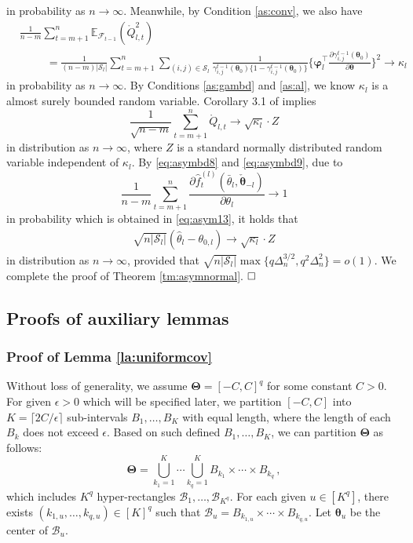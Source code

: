 \documentclass[12pt]{article}
\newcommand{\bTheta}{\boldsymbol \Theta}
\newcommand{\btheta}{\boldsymbol \theta}
\newcommand{\bvarphi}{\boldsymbol \varphi}
\def\T{{\scriptscriptstyle \top} }
\newcommand{\0}{{\bf 0}}
\begin{document}
in probability as $n\rightarrow\infty$. Meanwhile, by Condition \ref{as:conv}, we also have
\begin{align*}
&\frac{1}{n-m}\sum_{t=m+1}^n\mathbb{E}_{\mathcal{F}_{t-1}}(\mathring{Q}_{l,t}^2)\\
&~~~~~~~~~~~=\frac{1}{(n-m)|\mathcal{S}_l|}\sum_{t=m+1}^n\sum_{(i,j)\in\mathcal{S}_l}\frac{1}{\gamma_{i,j}^{t-1}(\btheta_0)\{1-\gamma_{i,j}^{t-1}(\btheta_0)\}}\bigg\{\bvarphi_l^{\T}\frac{\partial\gamma_{i,j}^{t-1}(\btheta_0)}{\partial\btheta}\bigg\}^2\rightarrow\kappa_l
\end{align*}
in probability as $n\rightarrow\infty$. By Conditions \ref{as:gambd} and \ref{as:al}, we know $\kappa_l$ is a almost surely bounded random variable. Corollary 3.1 of \cite{Hall1980_supp} 
implies
\[
\frac{1}{\sqrt{n-m}}\sum_{t=m+1}^n\mathring{Q}_{l,t}\rightarrow\sqrt{\kappa_l}\cdot Z
\]
in distribution as $n\rightarrow\infty$, where $Z$ is a standard normally distributed random variable independent of $\kappa_l$. By \eqref{eq:asymbd8} and \eqref{eq:asymbd9}, due to  
\[
\frac{1}{n-m}\sum_{t=m+1}^n\frac{\partial\hat{f}_t^{(l)}(\bar{\theta}_l,\check{\btheta}_{-l})}{\partial\theta_l}\rightarrow1
\]
in probability which is obtained in \eqref{eq:asym13}, it holds that
 \begin{align*}
\sqrt{n|\mathcal{S}_l|}(\hat{\theta}_l-\theta_{0,l})\rightarrow \sqrt{\kappa_l}\cdot Z
 \end{align*}
in distribution as $n\rightarrow\infty$, provided that $\sqrt{n|\mathcal{S}_l|}\max\{q\Delta_n^{3/2},q^2\Delta_n^2\}=o(1)$. We complete the proof of Theorem \ref{tm:asymnormal}. $\hfill\Box$





\subsection{Proofs of auxiliary lemmas}

\subsubsection{Proof of Lemma \ref{la:uniformcov}}\label{sec:pflauniformcov}
Without loss of generality, we assume $\bTheta=[-C,C]^q$ for some constant $C>0$. For given $\epsilon>0$ which will be specified later, we partition $[-C,C]$ into $K=\lceil 2C/\epsilon\rceil$ sub-intervals $B_1,\ldots,B_K$ with equal length, where the length of each $B_k$ does not exceed $\epsilon$. Based on such defined $B_1,\ldots,B_K$, we can partition $\bTheta$ as follows:
\[
\bTheta=\bigcup_{k_1=1}^K\cdots\bigcup_{k_q=1}^KB_{k_1}\times\cdots \times B_{k_q}\,,
\]
which includes $K^q$ hyper-rectangles $\mathcal{B}_1,\ldots,\mathcal{B}_{K^q}$. For each given $u\in[K^q]$, there exists $(k_{1,u},\ldots,k_{q,u})\in[K]^q$ such that $\mathcal{B}_u=B_{k_{1,u}}\times\cdots\times B_{k_{q,u}}$. Let $\btheta_u$ be the center of $\mathcal{B}_u$. 
\end{document}
